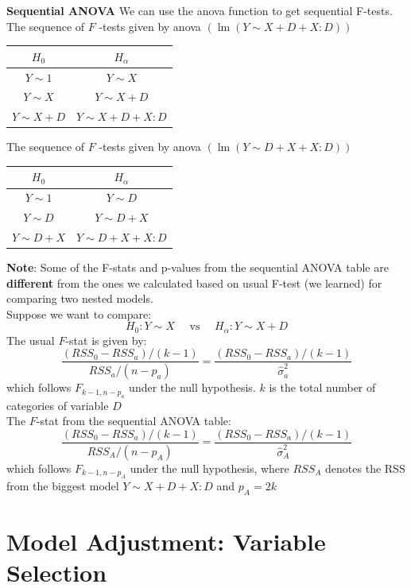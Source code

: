 \documentclass[11pt,a4paper]{article}
\begin{document}
\textbf{Sequential ANOVA}
We can use the anova function to get sequential F-tests. The sequence of $F$ -tests given by anova $(\operatorname{lm}(Y \sim X+D+X: D))$
\begin{center}
    \begin{tabular}{|c|c|}
        \hline$H_{0}$ & $H_{\alpha}$ \\
        \hline \hline$Y \sim 1$ & $Y \sim X$ \\
        $Y \sim X$ & $Y \sim X+D$ \\
        $Y \sim X+D$ & $Y \sim X+D+X: D$ \\
        \hline
        \end{tabular}
\end{center}
The sequence of $F$ -tests given by anova $(\operatorname{lm}(Y \sim D+X+X: D))$
\begin{center}
\begin{tabular}{|c|c|}
\hline$H_{0}$ & $H_{\alpha}$ \\
\hline \hline$Y \sim 1$ & $Y \sim D$ \\
$Y \sim D$ & $Y \sim D+X$ \\
$Y \sim D+X$ & $Y \sim D+X+X: D$ \\
\hline
\end{tabular}
\end{center}
\textbf{Note}: Some of the F-stats and p-values from the sequential ANOVA table are \textbf{diﬀerent} from the ones we calculated based on usual F-test (we learned) for comparing two nested models.\\
Suppose we want to compare:
$$
H_{0}: Y \sim X \quad \text { vs } \quad H_{\alpha}: Y \sim X+D
$$
The usual $F$-stat is given by:
$$
\frac{\left(R S S_{0}-R S S_{a}\right) /(k-1)}{R S S_{a} /\left(n-p_{a}\right)}=\frac{\left(R S S_{0}-R S S_{a}\right) /(k-1)}{\hat{\sigma}_{a}^{2}}
$$
which follows $F_{k-1, n-p_{a}}$ under the null hypothesis. $k$ is the total number of categories of variable $D$\\
The $F$-stat from the sequential ANOVA table:
$$
\frac{\left(R S S_{0}-R S S_{a}\right) /(k-1)}{R S S_{A} /\left(n-p_{A}\right)}=\frac{\left(R S S_{0}-R S S_{a}\right) /(k-1)}{\hat{\sigma}_{A}^{2}}
$$
which follows $F_{k-1, n-p_{A}}$ under the null hypothesis, where $R S S_{A}$ denotes the RSS from the biggest model $Y \sim X+D+X: D$ and $p_{A}=2 k$


\section{ Model Adjustment: Variable Selection}
\end{document}
